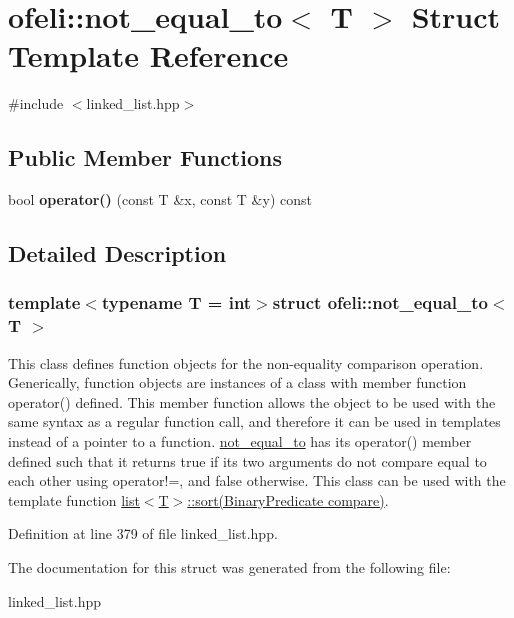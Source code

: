 \hypertarget{structofeli_1_1not__equal__to}{\section{ofeli\-:\-:not\-\_\-equal\-\_\-to$<$ T $>$ Struct Template Reference}
\label{structofeli_1_1not__equal__to}
}


{\ttfamily \#include $<$linked\-\_\-list.\-hpp$>$}

\subsection*{Public Member Functions}
\begin{DoxyCompactItemize}
\item 
\hypertarget{structofeli_1_1not__equal__to_ac3562b5ed24603ab03e5acc462db9974}{bool {\bfseries operator()} (const T \&x, const T \&y) const }\label{structofeli_1_1not__equal__to_ac3562b5ed24603ab03e5acc462db9974}

\end{DoxyCompactItemize}


\subsection{Detailed Description}
\subsubsection*{template$<$typename T = int$>$struct ofeli\-::not\-\_\-equal\-\_\-to$<$ T $>$}

This class defines function objects for the non-\/equality comparison operation. Generically, function objects are instances of a class with member function {\ttfamily operator()} defined. This member function allows the object to be used with the same syntax as a regular function call, and therefore it can be used in templates instead of a pointer to a function. {\ttfamily \hyperlink{structofeli_1_1not__equal__to}{not\-\_\-equal\-\_\-to}} has its {\ttfamily operator()} member defined such that it returns {\ttfamily true} if its two arguments do not compare equal to each other using {\ttfamily operator!=}, and {\ttfamily false} otherwise. This class can be used with the template function {\ttfamily \hyperlink{classofeli_1_1list_aaeedac18b70d233644d84c7ad3a9a3fa}{list$<$\-T$>$\-::sort(\-Binary\-Predicate compare)}}. 

Definition at line 379 of file linked\-\_\-list.\-hpp.



The documentation for this struct was generated from the following file\-:\begin{DoxyCompactItemize}
\item 
linked\-\_\-list.\-hpp\end{DoxyCompactItemize}
